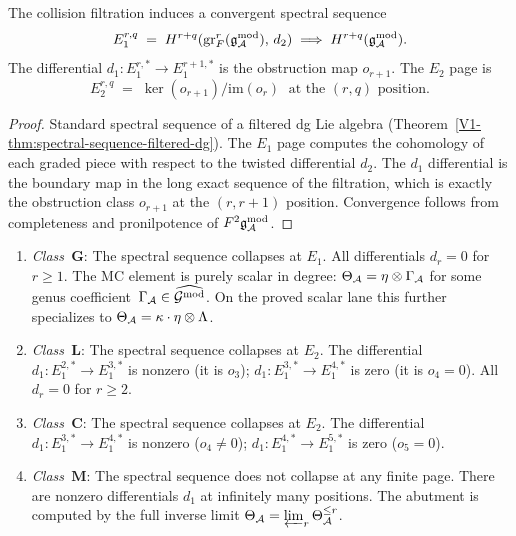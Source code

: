 \begin{theorem}
\ClaimStatusProvedHere
{}
The collision filtration induces a convergent spectral sequence
\begin{equation}%
E_1^{r,q}
\;=\;
H^{r+q}(\operatorname{gr}^r_F(\gAmod),\, d_2)
\;\Longrightarrow\;
H^{r+q}(\gAmod).
\end{equation}
The differential $d_1\colon E_1^{r,*} \to E_1^{r+1,*}$ is
the obstruction map $o_{r+1}$. The $E_2$ page is
\begin{equation}%
E_2^{r,q}
\;=\;
\ker(o_{r+1})/\mathrm{im}(o_r)
\;\text{ at the $(r,q)$ position.}
\end{equation}
\end{theorem}

\begin{proof}
Standard spectral sequence of a filtered dg Lie algebra
(Theorem~\ref{V1-thm:spectral-sequence-filtered-dg}). The
$E_1$ page computes the cohomology of each graded piece
with respect to the twisted differential $d_2$. The
$d_1$ differential is the boundary map in the long exact
sequence of the filtration, which is exactly the
obstruction class $o_{r+1}$ at the $(r, r+1)$ position.
Convergence follows from completeness and pronilpotence of
$F^2\mathfrak{g}_{\mathcal{A}}^{\mathrm{mod}}$.
\end{proof}

\begin{proposition}
\ClaimStatusProvedHere
{}
\begin{enumerate}[label=\textup{(\roman*)}]
\item \emph{Class~$\mathbf{G}$}: The spectral sequence
 collapses at $E_1$. All differentials $d_r = 0$ for
 $r \geq 1$. The MC element is purely scalar in degree:
 $\Theta_{\mathcal{A}}=\eta\otimes\Gamma_{\mathcal{A}}$ for some genus
 coefficient~$\Gamma_{\mathcal{A}}\in\widehat{\mathcal{G}^{\mathrm{mod}}}$. On the proved
 scalar lane this further specializes to
 $\Theta_{\mathcal{A}} = \kappa\cdot\eta\otimes\Lambda$.
\item \emph{Class~$\mathbf{L}$}: The spectral sequence
 collapses at $E_2$. The differential $d_1\colon
 E_1^{2,*} \to E_1^{3,*}$ is nonzero (it is $o_3$);
 $d_1\colon E_1^{3,*} \to E_1^{4,*}$ is zero (it is $o_4 = 0$).
 All $d_r = 0$ for $r \geq 2$.
\item \emph{Class~$\mathbf{C}$}: The spectral sequence
 collapses at $E_2$. The differential $d_1\colon
 E_1^{3,*} \to E_1^{4,*}$ is nonzero ($o_4 \neq 0$);
 $d_1\colon E_1^{4,*} \to E_1^{5,*}$ is zero ($o_5 = 0$).
\item \emph{Class~$\mathbf{M}$}: The spectral sequence does
 not collapse at any finite page. There are nonzero
 differentials $d_1$ at infinitely many positions. The
 abutment is computed by the full inverse limit
 $\Theta_{\mathcal{A}} = \varprojlim_r \Theta_{\mathcal{A}}^{\leq r}$.
\end{enumerate}
\end{proposition}

